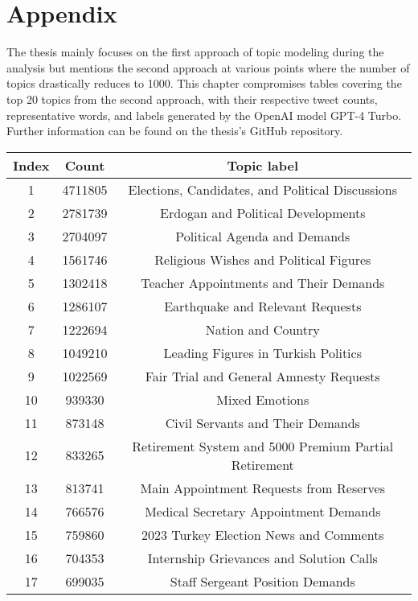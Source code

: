 \chapter{Appendix}

The thesis mainly focuses on the first approach of topic modeling during the analysis but 
mentions the second approach at various points where the number of topics drastically reduces 
to 1000. This chapter compromises tables covering the top 20 topics from the second approach, 
with their respective tweet counts, representative words, and labels generated by the OpenAI 
model GPT-4 Turbo. Further information can be found on the thesis's GitHub repository.

\begin{table}[htpb]
    \centering
    \begin{tabular}{|c c c|} 
     \hline
     \textbf{Index} & \textbf{Count} & \textbf{Topic label} \\ [0.5ex] 
     \hline\hline
     1 & 4711805 & Elections, Candidates, and Political Discussions \\
     2 & 2781739 & Erdogan and Political Developments \\
     3 & 2704097 & Political Agenda and Demands \\
     4 & 1561746 & Religious Wishes and Political Figures \\
     5 & 1302418 & Teacher Appointments and Their Demands \\
     6 & 1286107 & Earthquake and Relevant Requests \\
     7 & 1222694 & Nation and Country \\
     8 & 1049210 & Leading Figures in Turkish Politics \\
     9 & 1022569 & Fair Trial and General Amnesty Requests \\
     10 & 939330 & Mixed Emotions \\
     11 & 873148 & Civil Servants and Their Demands \\
     12 & 833265 & Retirement System and 5000 Premium Partial Retirement \\
     13 & 813741 & Main Appointment Requests from Reserves \\
     14 & 766576 & Medical Secretary Appointment Demands \\
     15 & 759860 & 2023 Turkey Election News and Comments \\
     16 & 704353 & Internship Grievances and Solution Calls \\
     17 & 699035 & Staff Sergeant Position Demands \\

\end{tabular}
\end{table}
